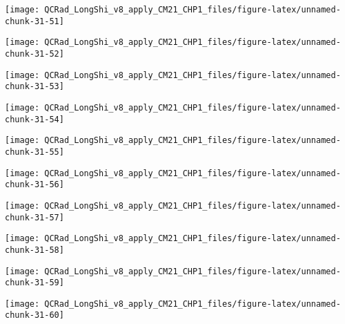 \documentclass[
  10pt,
  a4paper,oneside]{article}
\begin{document}
\begin{center}\texttt{[image: QCRad\_LongShi\_v8\_apply\_CM21\_CHP1\_files/figure-latex/unnamed-chunk-31-51]} \end{center}

\begin{center}\texttt{[image: QCRad\_LongShi\_v8\_apply\_CM21\_CHP1\_files/figure-latex/unnamed-chunk-31-52]} \end{center}

\begin{center}\texttt{[image: QCRad\_LongShi\_v8\_apply\_CM21\_CHP1\_files/figure-latex/unnamed-chunk-31-53]} \end{center}

\begin{center}\texttt{[image: QCRad\_LongShi\_v8\_apply\_CM21\_CHP1\_files/figure-latex/unnamed-chunk-31-54]} \end{center}

\begin{center}\texttt{[image: QCRad\_LongShi\_v8\_apply\_CM21\_CHP1\_files/figure-latex/unnamed-chunk-31-55]} \end{center}

\begin{center}\texttt{[image: QCRad\_LongShi\_v8\_apply\_CM21\_CHP1\_files/figure-latex/unnamed-chunk-31-56]} \end{center}

\begin{center}\texttt{[image: QCRad\_LongShi\_v8\_apply\_CM21\_CHP1\_files/figure-latex/unnamed-chunk-31-57]} \end{center}

\begin{center}\texttt{[image: QCRad\_LongShi\_v8\_apply\_CM21\_CHP1\_files/figure-latex/unnamed-chunk-31-58]} \end{center}

\begin{center}\texttt{[image: QCRad\_LongShi\_v8\_apply\_CM21\_CHP1\_files/figure-latex/unnamed-chunk-31-59]} \end{center}

\begin{center}\texttt{[image: QCRad\_LongShi\_v8\_apply\_CM21\_CHP1\_files/figure-latex/unnamed-chunk-31-60]} \end{center}
\end{document}
